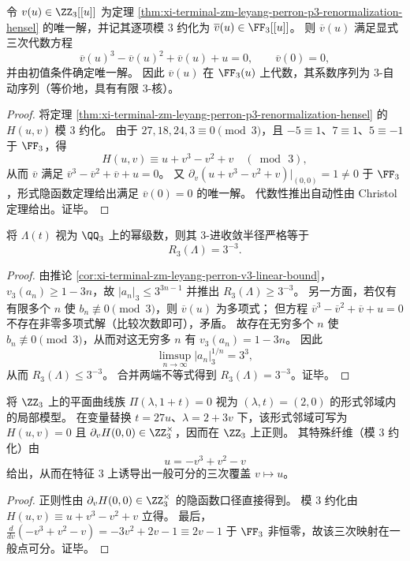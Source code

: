 \begin{theorem}[特征 \(3\) 的显式约化方程与自动结构]\label{thm:xi-terminal-zm-leyang-perron-p3-mod3-algebraic-automatic}
令 \(v(u)\in\ZZ_3[[u]]\) 为定理 \ref{thm:xi-terminal-zm-leyang-perron-p3-renormalization-hensel} 的唯一解，并记其逐项模 \(3\) 约化为 \(\overline v(u)\in\FF_3[[u]]\)。
则 \(\overline v(u)\) 满足显式三次代数方程
\[
\overline v(u)^3-\overline v(u)^2+\overline v(u)+u=0,
\qquad
\overline v(0)=0,
\]
并由初值条件确定唯一解。
因此 \(\overline v(u)\) 在 \(\FF_3(u)\) 上代数，其系数序列为 \(3\)-自动序列（等价地，具有有限 \(3\)-核）。
\end{theorem}
\begin{proof}
将定理 \ref{thm:xi-terminal-zm-leyang-perron-p3-renormalization-hensel} 的 \(H(u,v)\) 模 \(3\) 约化。
由于 \(27,18,24,3\equiv 0\pmod 3\)，且 \(-5\equiv 1\)、\(7\equiv 1\)、\(5\equiv -1\) 于 \(\FF_3\)，得
\[
H(u,v)\equiv u+v^3-v^2+v\quad(\bmod\,3),
\]
从而 \(\overline v\) 满足 \(\overline v^3-\overline v^2+\overline v+u=0\)。
又 \(\partial_v(u+v^3-v^2+v)|_{(0,0)}=1\neq 0\) 于 \(\FF_3\)，形式隐函数定理给出满足 \(\overline v(0)=0\) 的唯一解。
代数性推出自动性由 Christol 定理给出。证毕。
\end{proof}

\begin{theorem}\label{thm:xi-terminal-zm-leyang-perron-p3-radius}
将 \(\Lambda(t)\) 视为 \(\QQ_3\) 上的幂级数，则其 \(3\)-进收敛半径严格等于
\[
R_3(\Lambda)=3^{-3}.
\]
\end{theorem}
\begin{proof}
由推论 \ref{cor:xi-terminal-zm-leyang-perron-v3-linear-bound}，\(v_3(a_n)\ge 1-3n\)，故
\(
|a_n|_3\le 3^{3n-1}
\)
并推出 \(R_3(\Lambda)\ge 3^{-3}\)。
另一方面，若仅有有限多个 \(n\) 使 \(b_n\not\equiv 0\pmod 3\)，则 \(\overline v(u)\) 为多项式；
但方程 \(\overline v^3-\overline v^2+\overline v+u=0\) 不存在非零多项式解（比较次数即可），矛盾。
故存在无穷多个 \(n\) 使 \(b_n\not\equiv 0\pmod 3\)，从而对这无穷多 \(n\) 有 \(v_3(a_n)=1-3n\)。
因此
\[
\limsup_{n\to\infty}|a_n|_3^{1/n}=3^{3},
\]
从而 \(R_3(\Lambda)\le 3^{-3}\)。
合并两端不等式得到 \(R_3(\Lambda)=3^{-3}\)。证毕。
\end{proof}

\begin{corollary}[\texorpdfstring{$p=3$}{p=3} 处的局部半稳定化与覆盖度降阶]\label{cor:xi-terminal-zm-leyang-perron-p3-semistable-degree-drop}
将 \(\ZZ_3\) 上的平面曲线族 \(\Pi(\lambda,1+t)=0\) 视为 \((\lambda,t)=(2,0)\) 的形式邻域内的局部模型。
在变量替换 \(t=27u\)、\(\lambda=2+3v\) 下，该形式邻域可写为 \(H(u,v)=0\) 且 \(\partial_vH(0,0)\in\ZZ_3^\times\)，因而在 \(\ZZ_3\) 上正则。
其特殊纤维（模 \(3\) 约化）由
\[
u=-v^3+v^2-v
\]
给出，从而在特征 \(3\) 上诱导出一般可分的三次覆盖 \(v\mapsto u\)。
\end{corollary}
\begin{proof}
正则性由 \(\partial_vH(0,0)\in\ZZ_3^\times\) 的隐函数口径直接得到。
模 \(3\) 约化由
\(
H(u,v)\equiv u+v^3-v^2+v
\)
立得。
最后，\(\frac{d}{dv}(-v^3+v^2-v)= -3v^2+2v-1\equiv 2v-1\) 于 \(\FF_3\) 非恒零，故该三次映射在一般点可分。证毕。
\end{proof}

